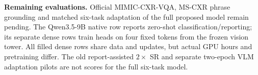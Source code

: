 \documentclass[10pt,letterpaper]{article}
\begin{document}
\textbf{Remaining evaluations.}
Official MIMIC-CXR-VQA, MS-CXR phrase grounding and matched six-task adaptation
of the full proposed model remain pending. The Qwen3.5-9B native row reports
zero-shot classification/reporting; its separate dense rows train heads on
four fixed tokens from the frozen vision tower. All filled dense rows share
data and updates, but actual GPU hours and pretraining differ. The old
report-assisted $2\times$ SR and separate two-epoch VLM adaptation pilots are
not scores for the full six-task model.
\end{document}
